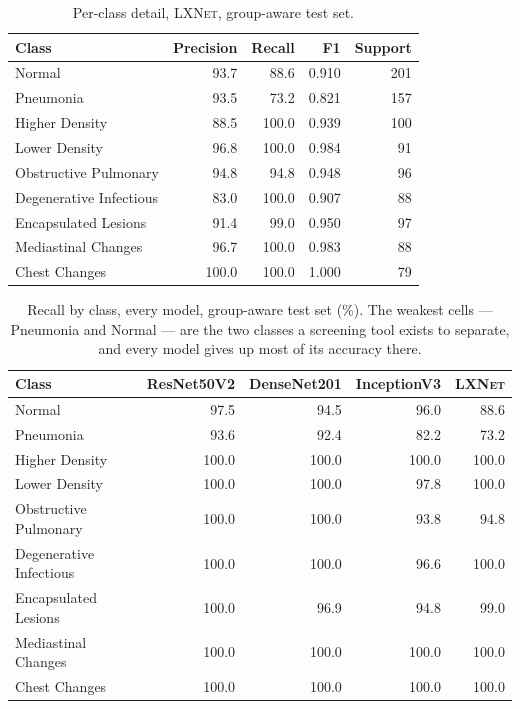 \documentclass[11pt,a4paper,oneside]{report}
\newcommand{\LXNet}{\textsc{LXNet}}
\begin{document}
\begin{table}[h]
\centering
\small
\begin{tabular}{@{}lrrrr@{}}
\toprule
\textbf{Class} & \textbf{Precision} & \textbf{Recall} & \textbf{F1} & \textbf{Support} \\
\midrule
Normal & 93.7 & 88.6 & 0.910 & 201 \\
Pneumonia & 93.5 & 73.2 & 0.821 & 157 \\
Higher Density & 88.5 & 100.0 & 0.939 & 100 \\
Lower Density & 96.8 & 100.0 & 0.984 & 91 \\
Obstructive Pulmonary & 94.8 & 94.8 & 0.948 & 96 \\
Degenerative Infectious & 83.0 & 100.0 & 0.907 & 88 \\
Encapsulated Lesions & 91.4 & 99.0 & 0.950 & 97 \\
Mediastinal Changes & 96.7 & 100.0 & 0.983 & 88 \\
Chest Changes & 100.0 & 100.0 & 1.000 & 79 \\
\bottomrule
\end{tabular}
\caption{Per-class detail, \LXNet{}, group-aware test set.}
\label{tab:per-class-lxnet}
\end{table}

\begin{table}[h]
\centering
\small
\begin{tabular}{@{}lrrrr@{}}
\toprule
\textbf{Class} & \textbf{ResNet50V2} & \textbf{DenseNet201} & \textbf{InceptionV3} & \textbf{\LXNet{}} \\
\midrule
Normal & 97.5 & 94.5 & 96.0 & 88.6 \\
Pneumonia & 93.6 & 92.4 & 82.2 & 73.2 \\
Higher Density & 100.0 & 100.0 & 100.0 & 100.0 \\
Lower Density & 100.0 & 100.0 & 97.8 & 100.0 \\
Obstructive Pulmonary & 100.0 & 100.0 & 93.8 & 94.8 \\
Degenerative Infectious & 100.0 & 100.0 & 96.6 & 100.0 \\
Encapsulated Lesions & 100.0 & 96.9 & 94.8 & 99.0 \\
Mediastinal Changes & 100.0 & 100.0 & 100.0 & 100.0 \\
Chest Changes & 100.0 & 100.0 & 100.0 & 100.0 \\
\bottomrule
\end{tabular}
\caption{Recall by class, every model, group-aware test set (\%). The
weakest cells --- Pneumonia and Normal --- are the two classes a screening
tool exists to separate, and every model gives up most of its accuracy
there.}
\label{tab:recall-by-class}
\end{table}
\end{document}
